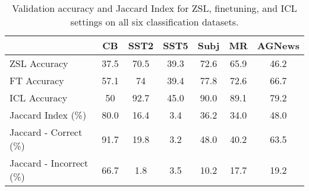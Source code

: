 \begin{table*}[ht!]
  \centering
  \setlength{\tabcolsep}{7pt}
  \begin{tabular}{l | c c c c c c}
  \toprule
  & \textbf{CB} & \textbf{SST2} & \textbf{SST5} & \textbf{Subj} & \textbf{MR} & \textbf{AGNews} \\ 
  \midrule
   ZSL Accuracy & 37.5 & 70.5 & 39.3 & 72.6 & 65.9 & 46.2 \\
   FT Accuracy & 57.1 & 74 & 39.4 & 77.8 & 72.6 & 66.7 \\
   ICL Accuracy & 50 & 92.7 & 45.0 & 90.0 & 89.1 & 79.2 \\
  \midrule
  Jaccard Index (\%)           & 80.0 & 16.4 & 3.4 & 36.2 & 34.0 & 48.0 \\
  Jaccard - Correct (\%) & 91.7 & 19.8 & 3.2 & 48.0 & 40.2 & 63.5 \\
  Jaccard - Incorrect (\%) & 66.7 & 1.8 & 3.5 & 10.2 & 17.7 & 19.2 \\
  \end{tabular}
  \caption{Validation accuracy and Jaccard Index for ZSL, finetuning, and ICL settings on all six classification datasets.}
  \label{tab:acc_jaccard}
\end{table*}